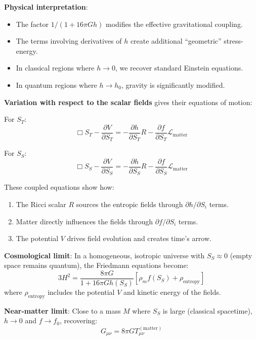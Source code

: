 \documentclass[12pt]{article}
\begin{document}
\textbf{Physical interpretation}:
\begin{itemize}
    \item The factor $1/(1 + 16\pi G h)$ modifies the effective gravitational coupling.
    \item The terms involving derivatives of $h$ create additional ``geometric'' stress-energy.
    \item In classical regions where $h \to 0$, we recover standard Einstein equations.
    \item In quantum regions where $h \to h_0$, gravity is significantly modified.
\end{itemize}

\textbf{Variation with respect to the scalar fields} gives their equations of motion:

For $S_T$:
\begin{equation}
    \Box S_T - \frac{\partial V}{\partial S_T}
    = - \frac{\partial h}{\partial S_T} R - \frac{\partial f}{\partial S_T} \mathcal{L}_\mathrm{matter}
\end{equation}

For $S_S$:
\begin{equation}
    \Box S_S - \frac{\partial V}{\partial S_S}
    = - \frac{\partial h}{\partial S_S} R - \frac{\partial f}{\partial S_S} \mathcal{L}_\mathrm{matter}
\end{equation}

These coupled equations show how:
\begin{enumerate}
    \item The Ricci scalar $R$ sources the entropic fields through $\partial h/\partial S_i$ terms.
    \item Matter directly influences the fields through $\partial f/\partial S_i$ terms.
    \item The potential $V$ drives field evolution and creates time's arrow.
\end{enumerate}

\textbf{Cosmological limit}: In a homogeneous, isotropic universe with $S_S \approx 0$ (empty space remains quantum), the Friedmann equations become:
\begin{equation}
    3 H^2 = \frac{8\pi G}{1 + 16\pi G h(S_S)} 
        \left[ \rho_m f(S_S) + \rho_\mathrm{entropy} \right]
\end{equation}
where $\rho_\mathrm{entropy}$ includes the potential $V$ and kinetic energy of the fields.

\textbf{Near-matter limit}: Close to a mass $M$ where $S_S$ is large (classical spacetime), $h \to 0$ and $f \to f_0$, recovering:
\begin{equation}
    G_{\mu\nu} = 8\pi G T^{(\mathrm{matter})}_{\mu\nu}
\end{equation}
\end{document}
